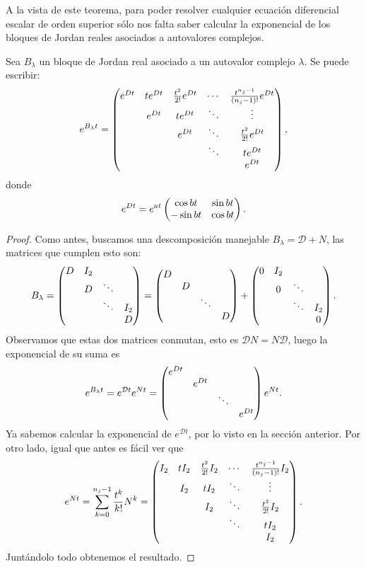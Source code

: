 \documentclass[../ecuaciones_diferenciales.tex]{subfiles}
\begin{document}
A la vista de este teorema, para poder resolver cualquier ecuación diferencial
escalar de orden superior sólo nos falta saber calcular la exponencial de los
bloques de Jordan reales asociados a autovalores complejos.

\begin{proposition}
	Sea \(B_\lambda\) un bloque de Jordan real asociado a un autovalor complejo 
	\(\lambda\). Se puede escribir:
	\[e^{B_\lambda t} = 
		\begin{pmatrix}e^{Dt} & te^{Dt} & \frac{t^2}{2!}e^{Dt} & \cdots & \frac{t^{n_j-1}}{(n_j-1)!}e^{Dt} \\
			& e^{Dt} & te^{Dt}                  & \ddots & \vdots                      \\
			&   & e^{Dt}                   & \ddots & \frac{t^2}{2!}e^{Dt}             \\
			&   &                     & \ddots & te^{Dt}                          \\
			&   &                     &        & e^{Dt}\end{pmatrix},\]
	donde
	\[e^{Dt} = e^{a t} \begin{pmatrix}\cos bt & \sin bt \\ -\sin bt & \cos bt\end{pmatrix}.\]
\end{proposition}

\begin{proof}
	Como antes, buscamos una descomposición manejable 
	\(B_\lambda = \mathcal{D} + N\), las matrices que cumplen esto son:
	\[B_\lambda = 
		\begin{pmatrix}D & I_2 & & \\ & D & \ddots & \\ & & \ddots & I_2 \\ & & & D\end{pmatrix} 
		= \begin{pmatrix}D & & & \\ & D & & \\ & & \ddots & \\ & & & D\end{pmatrix} +
		\begin{pmatrix}0 & I_2 & & \\ & 0 & \ddots & \\ & & \ddots & I_2 \\ & & & 0\end{pmatrix}.\]
	Observamos que estas dos matrices conmutan, esto es \(\mathcal{D}N =
	N\mathcal{D}\), luego la exponencial de su suma es
	\[e^{B_\lambda t} =
		e^{\mathcal{D}t} e^{Nt}
		= \begin{pmatrix}e^{Dt} & & & \\ & e^{Dt} & & \\ & & \ddots & \\ & & & e^{Dt}\end{pmatrix}
		e^{Nt}.\]
	Ya sabemos calcular la exponencial de \(e^{\mathcal{D}t}\), por lo visto en
	la sección anterior. Por otro lado, igual que antes es fácil ver que
	\[e^{Nt} = \sum_{k=0}^{n_j-1} \frac{t^k}{k!}N^k =
		\begin{pmatrix}I_2 & tI_2 & \frac{t^2}{2!}I_2 & \cdots & \frac{t^{n_j-1}}{(n_j-1)!}I_2 \\
			& I_2  & tI_2              & \ddots & \vdots                        \\
			&      & I_2               & \ddots & \frac{t^2}{2!}I_2             \\
			&      &                   & \ddots & tI_2                          \\
			&      &                   &        & I_2 \end{pmatrix}.\]
	Juntándolo todo obtenemos el resultado.
\end{proof}
\end{document}
